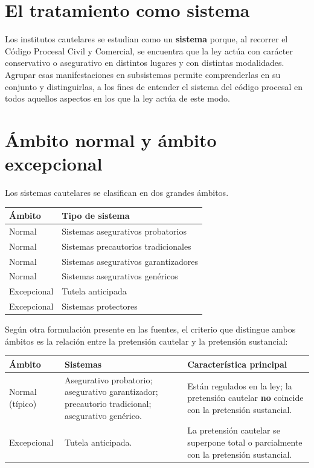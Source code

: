 \documentclass[12pt,oneside]{book}
\begin{document}
\section{El tratamiento como sistema}

Los institutos cautelares se estudian como un \textbf{sistema} porque, al recorrer el Código Procesal Civil y Comercial, se encuentra que la ley actúa con carácter conservativo o asegurativo en distintos lugares y con distintas modalidades. Agrupar esas manifestaciones en subsistemas permite comprenderlas en su conjunto y distinguirlas, a los fines de entender el sistema del código procesal en todos aquellos aspectos en los que la ley actúa de este modo.

\section{Ámbito normal y ámbito excepcional}

Los sistemas cautelares se clasifican en dos grandes ámbitos.

\begin{table}[H]
\centering
\begin{tabularx}{\textwidth}{>{\raggedright\arraybackslash}p{} Y}
\toprule
\textbf{Ámbito} & \textbf{Tipo de sistema} \\
\midrule
Normal & Sistemas asegurativos probatorios \\
Normal & Sistemas precautorios tradicionales \\
Normal & Sistemas asegurativos garantizadores \\
Normal & Sistemas asegurativos genéricos \\
Excepcional & Tutela anticipada \\
Excepcional & Sistemas protectores \\
\bottomrule
\end{tabularx}
\end{table}

Según otra formulación presente en las fuentes, el criterio que distingue ambos ámbitos es la relación entre la pretensión cautelar y la pretensión sustancial:

\noindent\begin{tabularx}{\textwidth}{@{}>{\raggedright\arraybackslash}p{2.6cm} Y Y@{}}
\toprule
\textbf{Ámbito} & \textbf{Sistemas} & \textbf{Característica principal} \\
\midrule
Normal (típico) &
Asegurativo probatorio; asegurativo garantizador; precautorio tradicional; asegurativo genérico. &
Están regulados en la ley; la pretensión cautelar \textbf{no} coincide con la pretensión sustancial. \\
\addlinespace
Excepcional &
Tutela anticipada. &
La pretensión cautelar se superpone total o parcialmente con la pretensión sustancial. \\
\bottomrule
\end{tabularx}
\end{document}
